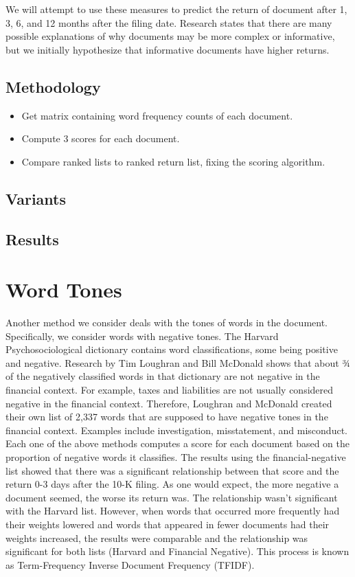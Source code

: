 \documentclass[12pt]{article}
\begin{document}
We will attempt to use these measures to predict the return of document after 1, 3, 6, and 12 months after the filing date. Research states that there are many possible explanations of why documents may be more complex or informative, but we initially hypothesize that informative documents have higher returns. 

\subsection{Methodology}

\begin{itemize}
	\item Get matrix containing word frequency counts of each document.
	\item Compute 3 scores for each document.
	\item Compare ranked lists to ranked return list, fixing the scoring algorithm. 
\end{itemize}	

\subsection{Variants}

\subsection{Results}

\section{Word Tones}

Another method we consider deals with the tones of words in the document. Specifically, we consider words with negative tones. The Harvard Psychosociological dictionary contains word classifications, some being positive and negative. Research by Tim Loughran and Bill McDonald shows that about ¾ of the negatively classified words in that dictionary are not negative in the financial context. For example, taxes and liabilities are not usually considered negative in the financial context. Therefore, Loughran and McDonald created their own list of 2,337 words that are supposed to have negative tones in the financial context. Examples include investigation, misstatement, and misconduct. Each one of the above methods computes a score for each document based on the proportion of negative words it classifies. The results using the financial-negative list showed that there was a significant relationship between that score and the return 0-3 days after the 10-K filing. As one would expect, the more negative a document seemed, the worse its return was. The relationship wasn’t significant with the Harvard list. However, when words that occurred more frequently had their weights lowered and words that appeared in fewer documents had their weights increased, the results were comparable and the relationship was significant for both lists (Harvard and Financial Negative). This process is known as Term-Frequency Inverse Document Frequency (TFIDF). 
\end{document}
